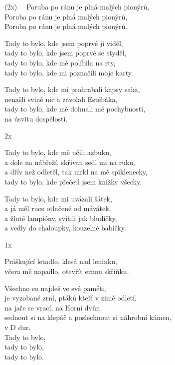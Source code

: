 
\cho{}
 (2x) \ \ Poruba po ránu je plná malých pionýrů,\\
Poruba po ránu je plná malých pionýrů,\\
Poruba po ránu je plná malých pionýrů. 

\ve{}
Tady to bylo, kde jsem poprvé ji viděl,\\
tady to bylo, kde jsem poprvé se styděl,\\
tady to bylo, kde mě políbila na rty,\\
tady to bylo, kde mi poznačili moje karty.

Tady to bylo, kde mi prohrabali kapsy saka,\\
nenašli svině nic a zavolali Estébáka,\\
tady to bylo, kde mě dohnali mé pochybnosti,\\
na úsvitu dospělosti.

\cho{} 2x

\ve{}
Tady to bylo, kde mě učili azbuku,\\
a dole na nábřeží, skřivan sedl mi na ruku,\\
a dřív než odletěl, tak mrkl na mě spiklenecky,\\
tady to bylo, kde přečetl jsem knížky všecky.

Tady to bylo, kde mi uvázali šátek,\\
a já měl ruce otlačené od mávátek,\\
a žluté lampióny, svítili jak bludičky,\\
a vedly do chaloupky, kouzelné babičky.

\cho{} 1x

\re{}
Práškující letadlo, klesá nad leninku,\\
včera mě napadlo, otevřít ernou skříňku.

\ve{}
Všechno co najdeš ve své paměti,\\
je vyzobané zrní, ptáků kteří v zimě odletí,\\
na jaře se vrací, na Horní dvůr,\\
sednout si na klepáč a poslechnout si náhrobní kámen,\\
v D dur.\\
Tady to bylo,\\
tady to bylo,\\
tady to bylo.

